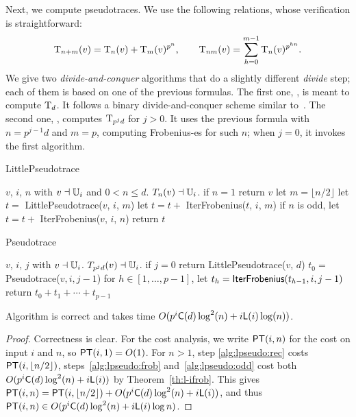 \smallskip

Next, we compute pseudotraces. We use the following relations, whose
verification is straightforward:
\begin{equation*}
  \operatorname{T}_{n+m}(v) =
  \operatorname{T}_{n}(v) + \operatorname{T}_{m}(v)^{p^n}
  \text{,}\qquad
  \operatorname{T}_{nm}(v) =
  \sum_{h=0}^{m-1}\operatorname{T}_{n}(v)^{p^{hn}}
  \text{.}
\end{equation*}
We give two \emph{divide-and-conquer} algorithms that do a slightly
different \emph{divide} step; each of them is based on one of the
previous formulas. The first one, , is meant to
compute $\operatorname{T}_d$. It follows a binary divide-and-conquer scheme
similar to~\cite[Algorithm~5.2]{vzGS92}. The second one,
, computes $\operatorname{T}_{p^jd}$ for $j>0$. It uses the
previous formula with $n=p^{j-1}d$ and $m=p$, computing Frobenius-es
for such $n$; when $j=0$, it invokes the first algorithm.


\begin{algorithm}
  \caption{LittlePseudotrace}
  \begin{algorithmic}[1]
    \REQUIRE $v$, $i$, $n$ with $v\dashv\mathbb{U}_i$ and $0<n\le d$.
    \ENSURE $T_{n}(v) \dashv \mathbb{U}_i$.
    \STATE \label{alg:lpseudo:base} if $n = 1$ return $v$
    \STATE \label{alg:lpseudo:half} let $m = \lfloor n/2 \rfloor$
    \STATE \label{alg:lpseudo:rec} let $t=$ {\sf LittlePseudotrace}($v$,
    $i$, $m$)
    \STATE \label{alg:lpseudo:frob} let $t=t+$ {\sf IterFrobenius}($t$, $i$, $m$)
    \STATE \label{alg:lpseudo:odd} if $n$ is odd, let $t=t+$ {\sf
      IterFrobenius}($v$, $i$, $n$)
    \STATE return $t$
  \end{algorithmic}
\end{algorithm}
\begin{algorithm}
  \caption{Pseudotrace}
  \begin{algorithmic}[1]
    \REQUIRE $v$, $i$, $j$ with $v\dashv\mathbb{U}_i$.
    \ENSURE $T_{p^jd}(v) \dashv \mathbb{U}_i$.
    \STATE \label{alg:pseudo:base} if $j = 0$ return {\sf LittlePseudotrace}($v$, $d$)
    \STATE \label{alg:pseudo:rec} $t_0=${\sf Pseudotrace}($v, i, j-1$)
    \STATE \label{alg:pseudo:frob}for $h\in [1,\dots,p-1]$, let $t_h=\text{{\sf IterFrobenius}}(t_{h-1}, i, j-1)$
    \STATE \label{alg:pseudo:sum}return $t_0 + t_1 + \cdots + t_{p-1}$
  \end{algorithmic}
\end{algorithm}

\begin{theorem}
  \label{th:l-pseudo}
  Algorithm  is correct and takes time
  $O(p^i\mathrm{\sf C}(d)\log^2 (n) + i \mathsf{L}(i)\log (n))$.
\end{theorem}
\begin{proof} Correctness is clear. For the cost analysis, we write
$\mathrm{\sf PT}(i,n)$ for the cost on input $i$ and $n$, so $\mathrm{\sf PT}(i,1)=O(1)$.
For $n>1$, step \ref{alg:lpseudo:rec} costs $\mathrm{\sf PT}(i,\lfloor n/2
\rfloor)$, steps~\ref{alg:lpseudo:frob} and~\ref{alg:lpseudo:odd} cost
both $O(p^i\mathrm{\sf C}(d)\log^2 (n) + i \mathsf{L}(i))$ by
Theorem~\ref{th:l-ifrob}. This gives $\mathrm{\sf PT}(i,n) = \mathrm{\sf PT}(i,\lfloor
n/2\rfloor) +O(p^i\mathrm{\sf C}(d)\log^2 (n) + i \mathsf{L}(i))$, and thus $\mathrm{\sf PT}(i,n)
\in O(p^i\mathrm{\sf C}(d)\log^2 (n) + i \mathsf{L}(i)\log n)$.\end{proof}



